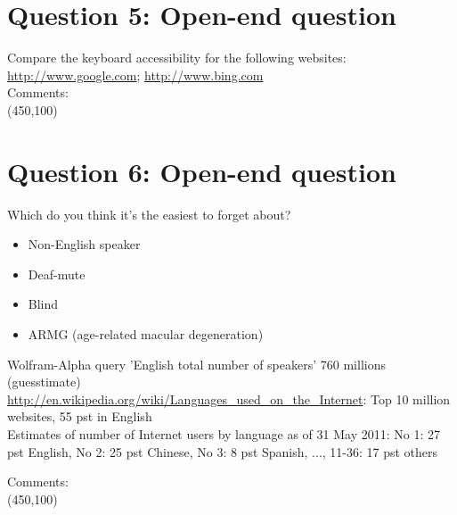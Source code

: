 \documentclass[12pt,a4paper,norsk]{article}
\begin{document}
\section {Question 5: Open-end question} Compare the keyboard accessibility for the following websites:
\url{http://www.google.com}; \url{http://www.bing.com} \\

\noindent Comments:\\
\framebox(450,100){}\\

\section {Question 6: Open-end question} Which do you think it’s the easiest to forget about?

\begin{itemize}
 \item Non-English speaker
 \item Deaf-mute
 \item Blind
 \item ARMG (age-related macular degeneration)
\end{itemize}

Wolfram-Alpha query 'English total number of speakers' 760 millions (guesstimate) \\
\url{http://en.wikipedia.org/wiki/Languages_used_on_the_Internet}: Top 10 million websites, 55 pst in English \\
Estimates of number of Internet users by language as of 31 May 2011: No 1: 27 pst English, No 2: 25 pst Chinese, No 3: 8 pst Spanish, ..., 11-36: 17 pst others


\noindent Comments:\\
\framebox(450,100){}\\
\end{document}
